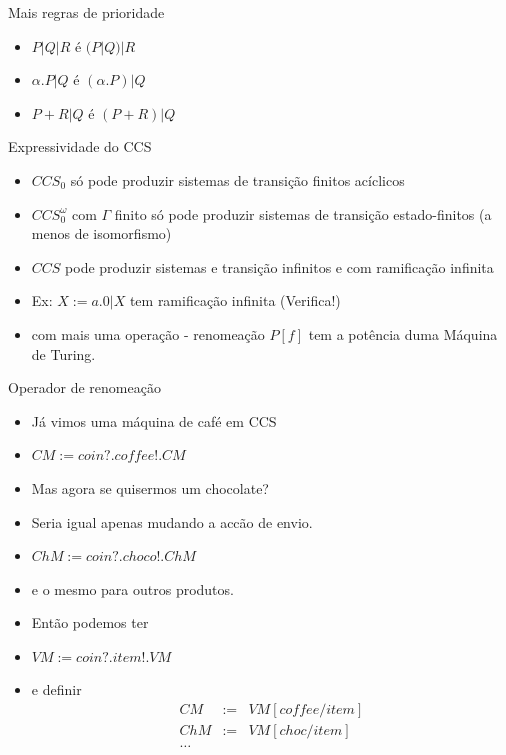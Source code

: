 \documentclass[aspectratio=169]{beamer}
\begin{document}
\begin{frame}{Mais regras de prioridade}
	\begin{itemize}[<+->]
	\item $P|Q|R$ é $(P|Q)|R$
\item  $\alpha.P | Q$ é $(\alpha.P) | Q$
\item $P + R | Q$ é $(P+R) | Q$
\end{itemize}
\end{frame}

\begin{frame}{Expressividade do CCS}
\begin{itemize}[<+->]
	\item $CCS_0$ só pode produzir sistemas de transição finitos acíclicos 
\item $CCS_0^\omega$ com $\Gamma$ finito só pode produzir sistemas de transição estado-finitos (a menos de isomorfismo)
\item $CCS$ pode produzir sistemas e transição infinitos e com ramificação infinita
\item Ex: $X:=a.0|X$ tem ramificação infinita (\alert{Verifica!})
\item com mais uma operação - renomeação $P[f]$ tem a potência duma Máquina de Turing.
\end{itemize}
\end{frame}
\begin{frame}{Operador de renomeação}
\begin{itemize}[<+->]
	\item Já vimos uma máquina de café em CCS
\item $CM:= coin?.coffee!.CM$
\item Mas agora se quisermos um chocolate? 
\item Seria igual apenas mudando a accão de envio.
\item $ChM:= coin?.choco!.ChM$
\item e o mesmo para outros produtos.
\item Então podemos ter
\item $VM:= coin?.item!.VM$
\item e definir
\begin{eqnarray*}
	CM&:=& VM[coffee/item]\\
	ChM&:=& VM[choc/item]\\
	\ldots	
\end{eqnarray*}
\end{itemize}	
\end{frame}
\end{document}
